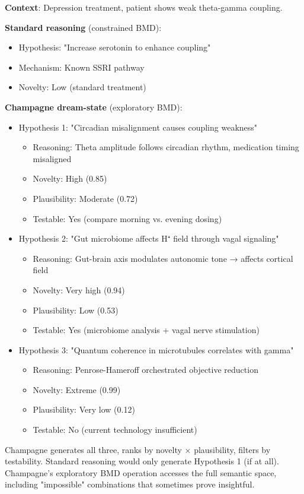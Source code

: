 \begin{example}
\textbf{Context}: Depression treatment, patient shows weak theta-gamma coupling.

\textbf{Standard reasoning} (constrained BMD):
\begin{itemize}
\item Hypothesis: "Increase serotonin to enhance coupling"
\item Mechanism: Known SSRI pathway
\item Novelty: Low (standard treatment)
\end{itemize}

\textbf{Champagne dream-state} (exploratory BMD):
\begin{itemize}
\item Hypothesis 1: "Circadian misalignment causes coupling weakness"
    \begin{itemize}
    \item Reasoning: Theta amplitude follows circadian rhythm, medication timing misaligned
    \item Novelty: High (0.85)
    \item Plausibility: Moderate (0.72)
    \item Testable: Yes (compare morning vs. evening dosing)
    \end{itemize}

\item Hypothesis 2: "Gut microbiome affects H⁺ field through vagal signaling"
    \begin{itemize}
    \item Reasoning: Gut-brain axis modulates autonomic tone → affects cortical field
    \item Novelty: Very high (0.94)
    \item Plausibility: Low (0.53)
    \item Testable: Yes (microbiome analysis + vagal nerve stimulation)
    \end{itemize}

\item Hypothesis 3: "Quantum coherence in microtubules correlates with gamma"
    \begin{itemize}
    \item Reasoning: Penrose-Hameroff orchestrated objective reduction
    \item Novelty: Extreme (0.99)
    \item Plausibility: Very low (0.12)
    \item Testable: No (current technology insufficient)
    \end{itemize}
\end{itemize}

Champagne generates all three, ranks by novelty × plausibility, filters by testability. Standard reasoning would only generate Hypothesis 1 (if at all). Champagne's exploratory BMD operation accesses the full semantic space, including "impossible" combinations that sometimes prove insightful.
\end{example}

